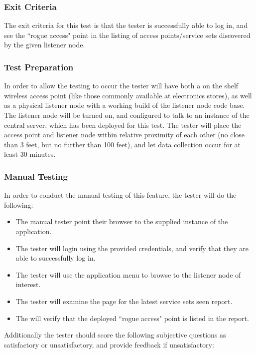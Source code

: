 \documentclass[]{article}
\begin{document}
    \subsubsection{Exit Criteria}
    
    The exit criteria for this test is that the tester is successfully able to log in, and see the 
    ``rogue access" point in the listing of access points/service sets discovered by the given listener node.	
	
	\subsubsection{Test Preparation}	
	
	In order to allow the testing to occur the tester will have both a on the shelf wireless access point
	(like those commonly available at electronics stores), as well as a physical listener node with a
	working build of the listener node code base. The listener node will be turned on, and configured to
	talk to an instance of the central server, which has been deployed for this test. The tester will
	place the access point and listener node within relative proximity of each other (no close than 3 feet,
	but no further than 100 feet), and let data collection occur for at least 30 minutes.
	
	\subsubsection{Manual Testing}
	
	In order to conduct the manual testing of this feature, the tester will do the following:
	
	\begin{itemize}
	    \item The manual tester point their browser to the supplied instance of the application.
	    \item The tester will login using the provided credentials, and verify that they are able to successfully log in.
	    \item The tester will use the application menu to browse to the listener node of interest.
	    \item The tester will examine the page for the latest service sets seen report.
	    \item The will verify that the deployed ``rogue access" point is listed in the report.
	\end{itemize}
	
	Additionally the tester should score the following subjective questions as satisfactory or unsatisfactory,
	and provide feedback if unsatisfactory:
	
\end{document}
